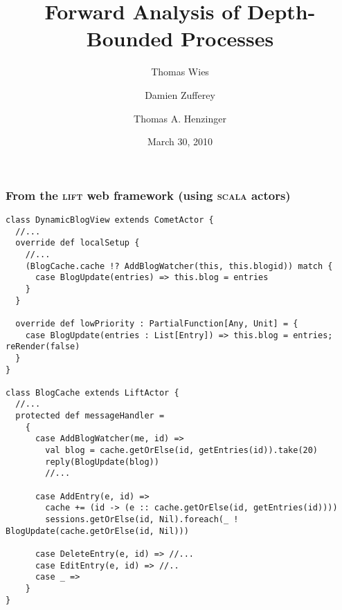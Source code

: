 \documentclass{beamer}
\title[Forward Analysis]{Forward Analysis of Depth-Bounded Processes}
\author{Thomas Wies \and \alert{Damien Zufferey} \and Thomas A. Henzinger}
\institute{
  IST Austria (Institute of Science and Technology Austria)
}
\date{March 30, 2010}
\begin{document}
\frame[plain]{\titlepage}


\begin{frame}[fragile]
  \frametitle{From the \textsc{lift} web framework (using \textsc{scala} actors) }
  {\tiny
  \begin{verbatim}
class DynamicBlogView extends CometActor {
  //...
  override def localSetup {
    //...
    (BlogCache.cache !? AddBlogWatcher(this, this.blogid)) match {
      case BlogUpdate(entries) => this.blog = entries
    }
  }
                                                                                                                      
  override def lowPriority : PartialFunction[Any, Unit] = {
    case BlogUpdate(entries : List[Entry]) => this.blog = entries; reRender(false)
  }
}

class BlogCache extends LiftActor {
  //...
  protected def messageHandler =
    {
      case AddBlogWatcher(me, id) =>
        val blog = cache.getOrElse(id, getEntries(id)).take(20)
        reply(BlogUpdate(blog))
        //...
                                                    
      case AddEntry(e, id) =>
        cache += (id -> (e :: cache.getOrElse(id, getEntries(id))))
        sessions.getOrElse(id, Nil).foreach(_ ! BlogUpdate(cache.getOrElse(id, Nil)))
      
      case DeleteEntry(e, id) => //...
      case EditEntry(e, id) => //..
      case _ =>
    }
}
  \end{verbatim}
  }
\end{frame}
\end{document}
